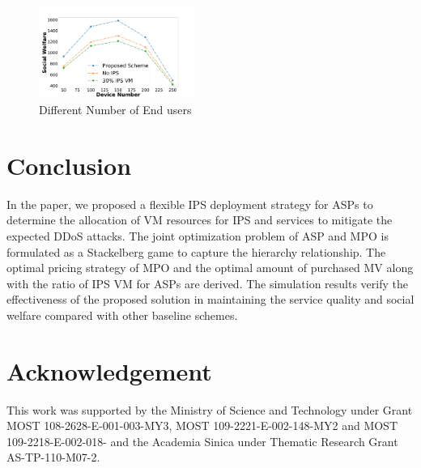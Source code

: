 \documentclass[conference]{IEEEtran}
\begin{document}
\begin{figure}
    \centering
  \includegraphics[width=0.45\textwidth]{5GDDoS_Game_social_device_conf.pdf}
\caption{Different Number of End users}
\vspace{-0.8em}
\label{subfig-2:num_cmp}
\end{figure}

\section{Conclusion} \label{sec:conclusion}
In the paper, we proposed a flexible IPS deployment strategy for ASPs to determine the allocation of VM resources for IPS and services to mitigate the expected DDoS attacks. The joint optimization problem of ASP and MPO is formulated as a Stackelberg game to capture the hierarchy relationship. The optimal pricing strategy of MPO and the optimal amount of purchased MV along with the ratio of IPS VM for ASPs are derived. The simulation results verify the effectiveness of the proposed solution in maintaining the service quality and social welfare compared with other baseline schemes.

\section{Acknowledgement}
This work was supported by the Ministry of Science and Technology under Grant MOST 108-2628-E-001-003-MY3, MOST 109-2221-E-002-148-MY2 and MOST 109-2218-E-002-018- and the Academia Sinica under Thematic Research Grant AS-TP-110-M07-2.




\end{document}
